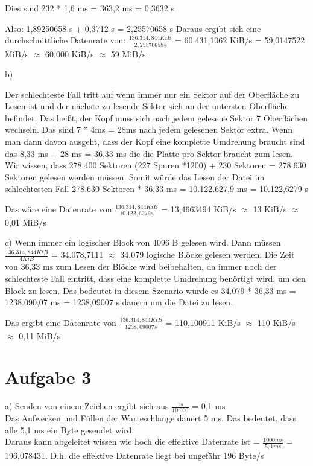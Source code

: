 \documentclass{ti2}
\begin{document}
Dies sind 232 * 1,6 ms = 363,2 ms = 0,3632 s

Also: 1,89250658 s + 0,3712 s = 2,25570658 s
Daraus ergibt sich eine durchschnittliche Datenrate von: $\frac{136.314,844 KiB}{2,25570658 s}$ = 60.431,1062 KiB/s = 59,0147522 MiB/s $\approx$ 60.000 KiB/s $\approx$ 59 MiB/s


b)

Der schlechteste Fall tritt auf wenn immer nur ein Sektor auf der Oberfläche zu Lesen ist und der nächste zu lesende Sektor sich an der untersten Oberfläche befindet. Das heißt, der Kopf muss sich nach jedem gelesene Sektor 7 Oberflächen wechseln. Das sind 7 * 4ms = 28ms nach jedem gelesenen Sektor extra. Wenn man dann davon ausgeht, dass der Kopf eine komplette Umdrehung braucht sind das 8,33 ms + 28 ms = 36,33 ms die die Platte pro Sektor braucht zum lesen. Wir wissen, dass 278.400 Sektoren (227 Spuren *1200) + 230 Sektoren = 278.630 Sektoren gelesen werden müssen. Somit würde das Lesen der Datei im schlechtesten Fall 278.630 Sektoren * 36,33 ms = 10.122.627,9 ms = 10.122,6279 s 

Das wäre eine Datenrate von $\frac{136.314,844 KiB}{10.122,6279 s}$ = 13,4663494 KiB/s $\approx$ 13 KiB/s $\approx$ 0,01 MiB/s


c)
Wenn immer ein logischer Block von 4096 B gelesen wird. Dann müssen $\frac{136.314,844 KiB}{4 KiB}$ = 34.078,7111 $\approx$ 34.079 logische Blöcke gelesen werden. Die Zeit von 36,33 ms zum Lesen der Blöcke wird beibehalten, da immer noch der schlechteste Fall eintritt, dass eine komplette Umdrehung benörtigt wird, um den Block zu lesen.
Das bedeutet in diesem Szenario würde es 34.079 * 36,33 ms = 1238.090,07 ms = 1238,09007 s dauern um die Datei zu lesen.

Das ergibt eine Datenrate von $\frac{136.314,844 KiB}{1238,09007 s}$ = 110,100911 KiB/s $\approx$ 110 KiB/s $\approx$ 0,11 MiB/s

\section*{Aufgabe 3}

a)
Senden von einem Zeichen ergibt sich aus  $\frac{1 s}{10.000}$ = 0,1 ms \\
Das Aufwecken und Füllen der Warteschlange dauert 5 ms. Das bedeutet, dass alle 5,1 ms ein Byte gesendet wird.\\
Daraus kann abgeleitet wissen wie hoch die effektive Datenrate ist = $\frac{1000ms}{5,1ms}$ = 196,078431. D.h. die effektive Datenrate liegt bei ungefähr 196 Byte/s
\end{document}
